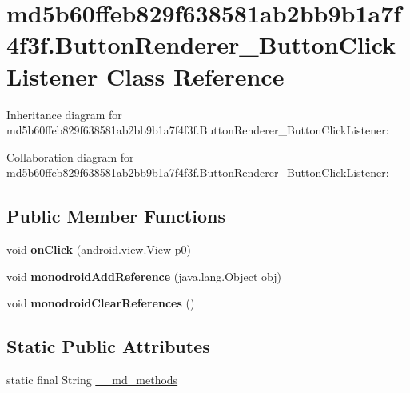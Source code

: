 \hypertarget{classmd5b60ffeb829f638581ab2bb9b1a7f4f3f_1_1_button_renderer___button_click_listener}{}\section{md5b60ffeb829f638581ab2bb9b1a7f4f3f.\+Button\+Renderer\+\_\+\+Button\+Click\+Listener Class Reference}
\label{classmd5b60ffeb829f638581ab2bb9b1a7f4f3f_1_1_button_renderer___button_click_listener}


Inheritance diagram for md5b60ffeb829f638581ab2bb9b1a7f4f3f.\+Button\+Renderer\+\_\+\+Button\+Click\+Listener\+:


Collaboration diagram for md5b60ffeb829f638581ab2bb9b1a7f4f3f.\+Button\+Renderer\+\_\+\+Button\+Click\+Listener\+:
\subsection*{Public Member Functions}
\begin{DoxyCompactItemize}
\item 
\mbox{\label{classmd5b60ffeb829f638581ab2bb9b1a7f4f3f_1_1_button_renderer___button_click_listener_a73c958e3551a985f92dbe6bde665dfbc}} 
void {\bfseries on\+Click} (android.\+view.\+View p0)
\item 
\mbox{\label{classmd5b60ffeb829f638581ab2bb9b1a7f4f3f_1_1_button_renderer___button_click_listener_ae77c28c48a6a3831721989497df67679}} 
void {\bfseries monodroid\+Add\+Reference} (java.\+lang.\+Object obj)
\item 
\mbox{\label{classmd5b60ffeb829f638581ab2bb9b1a7f4f3f_1_1_button_renderer___button_click_listener_a412bbbc9b7d969906bb6c597440b57b6}} 
void {\bfseries monodroid\+Clear\+References} ()
\end{DoxyCompactItemize}
\subsection*{Static Public Attributes}
\begin{DoxyCompactItemize}
\item 
static final String \hyperlink{classmd5b60ffeb829f638581ab2bb9b1a7f4f3f_1_1_button_renderer___button_click_listener_a0ba3db9168a35b7cd52aeb7a3d5cbf30}{\+\_\+\+\_\+md\+\_\+methods}
\end{DoxyCompactItemize}



